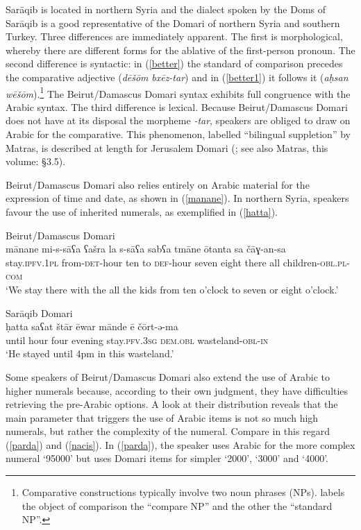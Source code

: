 \documentclass[output=paper]{langsci/langscibook}
\begin{document}
Sarāqib is located in northern Syria and the dialect spoken by the Doms of Sarāqib is a good representative of the Domari of northern Syria and southern Turkey. Three differences are immediately apparent. The first is morphological, whereby there are different forms for the ablative of the first-person pronoun. The second difference is syntactic: in (\ref{better}) the standard of comparison precedes the comparative adjective (\textit{dēšōm} \textit{bxēz-tar}) and in (\ref{better1}) it follows it (\textit{aḥsan} \textit{wēšōm}).\footnote{Comparative constructions typically involve two noun phrases (NPs). \citet{Stassen2013} labels the object of comparison the “compare NP” and the other the “standard NP”.} The Beirut/Damascus Domari syntax exhibits full congruence with the Arabic syntax. The third difference is lexical. Because Beirut/Damascus Domari does not have at its disposal the morpheme \textit{{}-tar}, speakers are obliged to draw on Arabic for the comparative. This phenomenon, labelled ``bilingual suppletion'' by Matras, is described at length for Jerusalem Domari (\citealt[379--382]{Matras2012}; see also Matras, this volume: §3.5).

Beirut/Damascus Domari also relies entirely on Arabic material for the expression of time and date, as shown in (\ref{manane}). In northern Syria, speakers favour the use of inherited numerals, as exemplified in (\ref{hatta}).

\ea\label{ex:key:}
{Beirut/Damascus Domari}\\ \label{manane}
\gll mānane mi-s-sāʕa ʕašra la s-sāʕa sabʕa tmāne ōtanta sa čāɣ-an-sa\\
     stay.\textsc{ipfv.1pl} from-\textsc{det}{}-hour ten to \textsc{def}{}-hour seven eight there all children-\textsc{obl.pl-com}\\
   \glt ‘We stay there with the all the kids from ten o'clock to seven or eight o'clock.’\\
\z

\ea\label{ex:key:} \label{hatta}
{Sarāqib Domari}\\
\gll ḥatta saʕat štār ēwar mānde ē čōrt-ə{}-ma\\
     until hour four evening stay.\textsc{pfv.3sg} \textsc{dem.obl} wasteland-\textsc{obl-in}\\
\glt ‘He stayed until 4pm in this wasteland.’
\z

Some speakers of Beirut/Damascus Domari also extend the use of Arabic to higher numerals because, according to their own judgment, they have difficulties retrieving the pre-Arabic options. A look at their distribution reveals that the main parameter that triggers the use of Arabic items is not so much high numerals, but rather the complexity of the numeral. Compare in this regard (\ref{parda}) and (\ref{nacis}). In (\ref{parda}), the speaker uses Arabic for the more complex numeral ‘95000’ but uses Domari items for simpler `2000', `3000' and `4000'.
\end{document}
